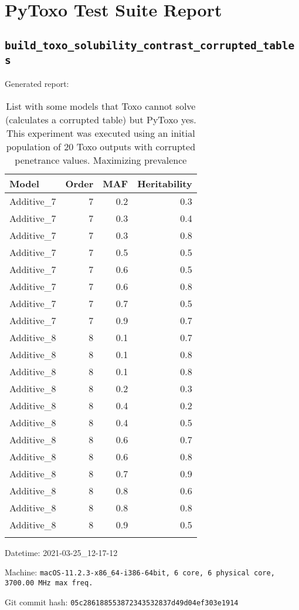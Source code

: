 \documentclass{article}
\begin{document}
\section*{PyToxo Test Suite Report}
\subsection*{\texttt{build\_toxo\_solubility\_contrast\_corrupted\_tables}}
Generated report:

\begin{longtable}[H]{lrrr}
\hline
 Model      &   Order &   MAF &   Heritability \\
\hline
 Additive\_7 &       7 &   0.2 &            0.3 \\
 Additive\_7 &       7 &   0.3 &            0.4 \\
 Additive\_7 &       7 &   0.3 &            0.8 \\
 Additive\_7 &       7 &   0.5 &            0.5 \\
 Additive\_7 &       7 &   0.6 &            0.5 \\
 Additive\_7 &       7 &   0.6 &            0.8 \\
 Additive\_7 &       7 &   0.7 &            0.5 \\
 Additive\_7 &       7 &   0.9 &            0.7 \\
 Additive\_8 &       8 &   0.1 &            0.7 \\
 Additive\_8 &       8 &   0.1 &            0.8 \\
 Additive\_8 &       8 &   0.1 &            0.8 \\
 Additive\_8 &       8 &   0.2 &            0.3 \\
 Additive\_8 &       8 &   0.4 &            0.2 \\
 Additive\_8 &       8 &   0.4 &            0.5 \\
 Additive\_8 &       8 &   0.6 &            0.7 \\
 Additive\_8 &       8 &   0.6 &            0.8 \\
 Additive\_8 &       8 &   0.7 &            0.9 \\
 Additive\_8 &       8 &   0.8 &            0.6 \\
 Additive\_8 &       8 &   0.8 &            0.8 \\
 Additive\_8 &       8 &   0.9 &            0.5 \\
\hline

\caption{List with some models that Toxo cannot solve (calculates a corrupted table) but PyToxo yes. This experiment was executed using an initial population of 20 Toxo outputs with corrupted penetrance values. Maximizing prevalence}
\end{longtable}
Datetime: 2021-03-25\_12-17-12

Machine: \texttt{macOS-11.2.3-x86\_64-i386-64bit, 6 core, 6 physical core, 3700.00 MHz max freq.}

Git commit hash: \texttt{05c286188553872343532837d49d04ef303e1914}
\end{document}
